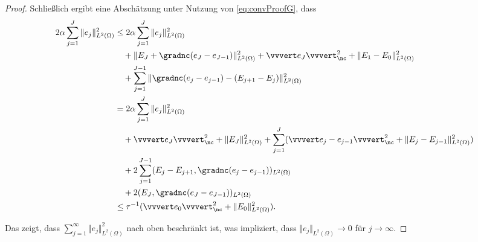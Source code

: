 \begin{proof}
  Schließlich ergibt eine Abschätzung unter Nutzung von \eqref{eq:convProofG}, 
  dass
  \begin{align*}
    2\alpha\sum_{j=1}^J\Vert e_j\Vert^2_{L^2(\Omega)} 
    &\leq
    2\alpha\sum_{j=1}^J\Vert e_j\Vert^2_{L^2(\Omega)}\\
    &\quad
    +\Vert E_J + \gradnc(e_J-e_{J-1}) \Vert_{L^2(\Omega)}^2 
    + \vvvert e_J \vvvert^2_\nc 
    + \Vert E_1 - E_0 \Vert^2_{L^2(\Omega)} \\
    &\quad 
    + \sum_{j=1}^{J-1}  
      \Vert \gradnc(e_j-e_{j-1}) - (E_{j+1} - E_j ) \Vert^2_{L^2(\Omega)} \\
    & = 
    2\alpha\sum_{j=1}^J\Vert e_j\Vert^2_{L^2(\Omega)}\\
    &\quad 
    +\vvvert e_J \vvvert^2_\nc + \Vert E_J \Vert_{L^2(\Omega)}^2 
    + \sum_{j=1}^J ( \vvvert e_j-e_{j-1} \vvvert^2_\nc
    + \Vert E_j - E_{j-1} \Vert^2_{L^2(\Omega)} )\\
    &\quad
    + 2\sum_{j=1}^{J-1}(E_j-E_{j+1},\gradnc(e_j-e_{j-1}))_{L^2(\Omega)}\\
    &\quad 
    + 2(E_{J},\gradnc(e_J-e_{J-1}))_{L^2(\Omega)} \\
    &\leq
    \tau^{-1}(\vvvert e_0\vvvert^2_\nc + \Vert E_0\Vert^2_{L^2(\Omega)}).
  \end{align*}

  Das zeigt, dass
  $\sum_{j=1}^\infty \Vert e_j\Vert _{L^2(\Omega)}^2$ nach oben beschränkt ist,
  was impliziert, dass $\Vert e_j\Vert_{L^2(\Omega)}\rightarrow 0$
  für $j\rightarrow \infty$.
\end{proof}


